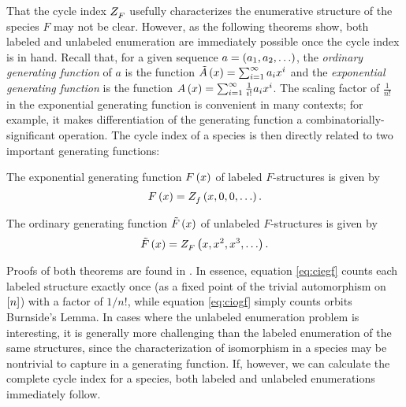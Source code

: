 \documentclass[distribution,draft]{brandiss} %
\numberwithin{section}{chapter}
\numberwithin{figure}{chapter}
\begin{document}
That the cycle index $ Z_{F}^{} $ usefully characterizes the enumerative structure of the species $F$ may not be clear.
However, as the following theorems show, both labeled and unlabeled enumeration are immediately possible once the cycle index is in hand.
Recall that, for a given sequence $a = \left( {a_{1}, a_{2}, \dots} \right)$, the \emph{ordinary generating function} of $a$ is the function $\tilde{A} \left( {x} \right) = \sum_{i = 1}^{\infty} a_{i} x^{i}$ and the \emph{exponential generating function}  is the function $A \left( {x} \right) = \sum_{i = 1}^{\infty} \frac{1}{i!} a_{i} x^{i}$.
The scaling factor of $\frac{1}{n!}$ in the exponential generating function is convenient in many contexts; for example, it makes differentiation of the generating function a combinatorially-significant operation.
The cycle index of a species is then directly related to two important generating functions:
\begin{theorem}\label{thm:ciegf}
  The exponential generating function $F \left( {x} \right)$ of labeled $F$-structures is given by
  \begin{equation}\label{eq:ciegf}
    F \left( {x} \right) =  Z_{f}^{} \left( {x, 0, 0, \dots} \right) .
  \end{equation}
\end{theorem}
\begin{theorem}\label{thm:ciogf}
  The ordinary generating function $\tilde{F} \left( {x} \right)$ of unlabeled $F$-structures is given by
  \begin{equation}\label{eq:ciogf}
    \tilde{F} \left( {x} \right) =  Z_{F}^{} \left( {x, x^{2}, x^{3}, \dots} \right) .
  \end{equation}
\end{theorem}
Proofs of both theorems are found in \cite[\S 1.2]{bll:species}.
In essence, equation \eqref{eq:ciegf} counts each labeled structure exactly once (as a fixed point of the trivial automorphism on $\left[ {n} \right]$) with a factor of $1/n!$, while equation \eqref{eq:ciogf} simply counts orbits  Burnside's Lemma.
In cases where the unlabeled enumeration problem is interesting, it is generally more challenging than the labeled enumeration of the same structures, since the characterization of isomorphism in a species may be nontrivial to capture in a generating function.
If, however, we can calculate the complete cycle index for a species, both labeled and unlabeled enumerations immediately follow.
\end{document}
